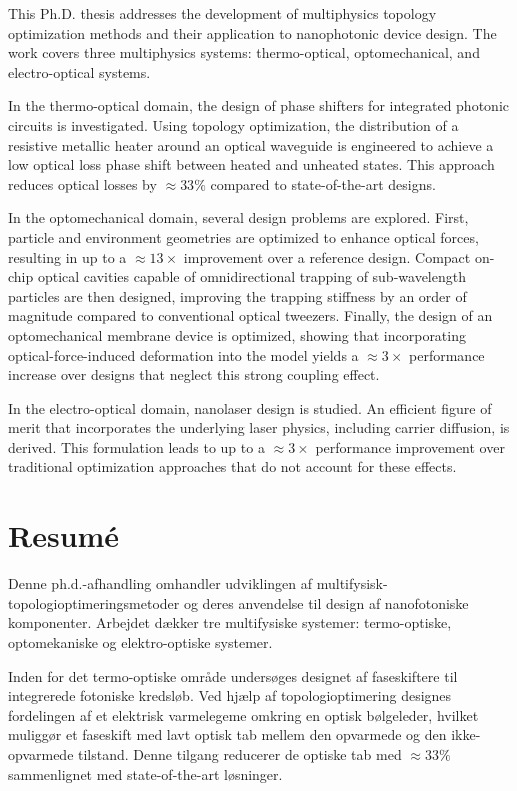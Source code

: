 This Ph.D. thesis addresses the development of multiphysics topology optimization methods and their application to nanophotonic device design. The work covers three multiphysics systems: thermo-optical, optomechanical, and electro-optical systems.

In the thermo-optical domain, the design of phase shifters for integrated photonic circuits is investigated. Using topology optimization, the distribution of a resistive metallic heater around an optical waveguide is engineered to achieve a low optical loss phase shift between heated and unheated states. This approach reduces optical losses by $\approx 33\%$ compared to state-of-the-art designs.

In the optomechanical domain, several design problems are explored. First, particle and environment geometries are optimized to enhance optical forces, resulting in up to a $\approx 13 \times$ improvement over a reference design. Compact on-chip optical cavities capable of omnidirectional trapping of sub-wavelength particles are then designed, improving the trapping stiffness by an order of magnitude compared to conventional optical tweezers. Finally, the design of an optomechanical membrane device is optimized, showing that incorporating optical-force-induced deformation into the model yields a $\approx 3 \times$ performance increase over designs that neglect this strong coupling effect.

In the electro-optical domain, nanolaser design is studied. An efficient figure of merit that incorporates the underlying laser physics, including carrier diffusion, is derived. This formulation leads to up to a $\approx 3\times$ performance improvement over traditional optimization approaches that do not account for these effects.

\chapter*{Resumé}
Denne ph.d.-afhandling omhandler udviklingen af mul\-ti\-fy\-sisk-to\-po\-lo\-gi\-op\-ti\-merings\-me\-to\-der og deres anvendelse til design af nanofotoniske komponenter. Arbejdet dækker tre multifysiske systemer: termo-optiske, opto\-mekaniske og elektro-optiske systemer.

Inden for det termo-optiske område undersøges designet af fase\-skiftere til integrerede fotoniske kredsløb. Ved hjælp af topologioptimering designes fordelingen af et elektrisk varmelegeme omkring en optisk bølgeleder, hvil\-ket muliggør et faseskift med lavt optisk tab mellem den opvarmede og den ikke-opvarmede tilstand. Denne tilgang reducerer de optiske tab med $\approx 33\%$ sammenlignet med state-of-the-art løsninger.

